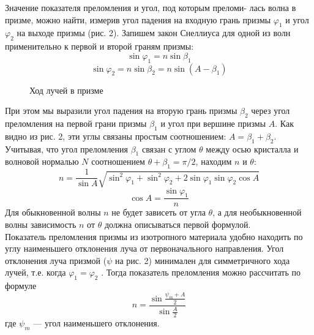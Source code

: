 \begin{enumerate}
    Значение показателя преломления и угол, под которым преломи-
лась волна в призме, можно найти, измерив угол падения на входную
грань призмы $\varphi_1$ и угол $\varphi_2$ на выходе призмы (рис. 2). Запишем закон Снеллиуса для одной из волн применительно к первой и второй граням призмы:
\[\sin{\varphi_1} = n \sin{\beta_1} \]
\[\sin{\varphi_2} = n \sin{\beta_2} = n \sin{(A - \beta_1)} \]
    \begin{figure}[h!]
        \noindent{}
        \caption{Ход лучей в призме}
    \end{figure}
    При этом мы выразили угол падения на вторую грань призмы $\beta_2$ через угол преломления на первой грани призмы $\beta_1$ и угол при вершине призмы $A$. Как видно из рис. 2, эти углы связаны простым соотношением: $A = \beta_1 + \beta_2$.\\
    Учитывая, что угол преломления $\beta_1$ связан с углом $\theta$ между осью кристалла и волновой нормалью $N$ соотношением $\theta + \beta_1 = \pi / 2$, находим $n$ и $\theta$:
\[ n = \frac{1}{\sin{A}} \sqrt{\sin^2{\varphi_1} + \sin^2{\varphi_2} + 2\sin{\varphi_1}\sin{\varphi_2}\cos{A} } \]
\[ \cos{A} = \frac{\sin{\varphi_1}}{n} \]    
    Для обыкновенной волны $n$ не будет зависеть от угла $\theta$, а для необыкновенной волны зависимость $n$ от $\theta$ должна описываться первой формулой. \\
    Показатель преломления призмы из изотропного материала удобно
находить по углу наименьшего отклонения луча от первоначального направления. Угол отклонения луча призмой ($\psi$ на рис. 2) минимален для симметричного хода лучей, т.е. когда $\varphi_1 = \varphi_2$ . Тогда показатель преломления можно рассчитать по формуле
\[n = \frac{\sin{\frac{\psi_m + A}{2}}}{\sin{\frac{A}{2}}} \]
где $\psi_m$ — угол наименьшего отклонения.    
\end{enumerate}
